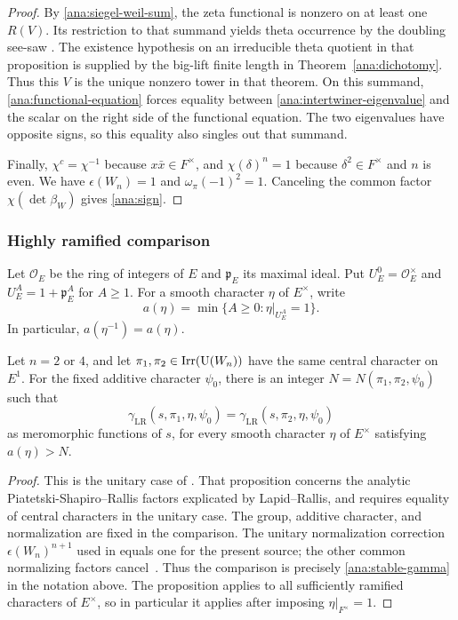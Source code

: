 \begin{proof}
By \eqref{ana:siegel-weil-sum}, the zeta functional is nonzero on
at least one $R(V)$. Its restriction to that summand yields theta
occurrence by the doubling see-saw
\cite[Proposition~3.1, p.~960]{HKS96}. The existence hypothesis
on an irreducible theta quotient in that proposition is supplied by
the big-lift finite length in Theorem~\ref{ana:dichotomy}.
Thus this $V$ is the unique nonzero tower in that theorem.
On this summand, \eqref{ana:functional-equation} forces equality
between \eqref{ana:intertwiner-eigenvalue} and the scalar on the
right side of the functional equation. The two eigenvalues have
opposite signs, so this equality also singles out that summand.

Finally, $\chi^c=\chi^{-1}$ because $x\bar x\in F^\times$,
and $\chi(\delta)^n=1$ because $\delta^2\in F^\times$ and $n$ is
even. We have $\epsilon(W_n)=1$ and $\omega_\pi(-1)^2=1$.
Canceling the common factor $\chi(\det\beta_W)$ gives
\eqref{ana:sign}.
\end{proof}

\subsubsection{Highly ramified comparison}

Let $\mathcal O_E$ be the ring of integers of $E$ and $\mathfrak p_E$
its maximal ideal. Put $U_E^0=\mathcal O_E^\times$ and
$U_E^A=1+\mathfrak p_E^A$ for $A\ge1$. For a smooth character
$\eta$ of $E^\times$, write
\[
 a(\eta)=\min\{A\ge0:\eta|_{U_E^A}=1\}.
\]
In particular, $a(\eta^{-1})=a(\eta)$.

\begin{proposition}
\label{ana:stability}
Let $n=2$ or $4$, and let $\pi_1,\pi_2\in\operatorname{Irr}(\operatorname{U}(W_n))$
have the same central character on $E^1$.
For the fixed additive character $\psi_0$, there is an integer
$N=N(\pi_1,\pi_2,\psi_0)$ such that
\begin{equation}\label{ana:stable-gamma}
 \gamma_{\mathrm{LR}}(s,\pi_1,\eta,\psi_0)
   =\gamma_{\mathrm{LR}}(s,\pi_2,\eta,\psi_0)
\end{equation}
as meromorphic functions of $s$, for every smooth character
$\eta$ of $E^\times$ satisfying $a(\eta)>N$.
\end{proposition}

\begin{proof}
This is the unitary case of \cite[Proposition~5.3]{FinisLapid}.
That proposition concerns the analytic Piatetski-Shapiro--Rallis
factors explicated by Lapid--Rallis, and requires equality of central
characters in the unitary case. The group, additive character, and
normalization are fixed in the comparison. The unitary normalization
correction $\epsilon(W_n)^{n+1}$ used in \cite[\S10.1]{GanIchinoFormal}
equals one for the present source; the other common normalizing
factors cancel~\cite[Remarks~5.3--5.5]{Kakuhama19}. Thus the comparison is precisely
\eqref{ana:stable-gamma} in the notation above.
The proposition applies to all sufficiently ramified characters of
$E^\times$, so in particular it applies after imposing
$\eta|_{F^\times}=1$.
\end{proof}


